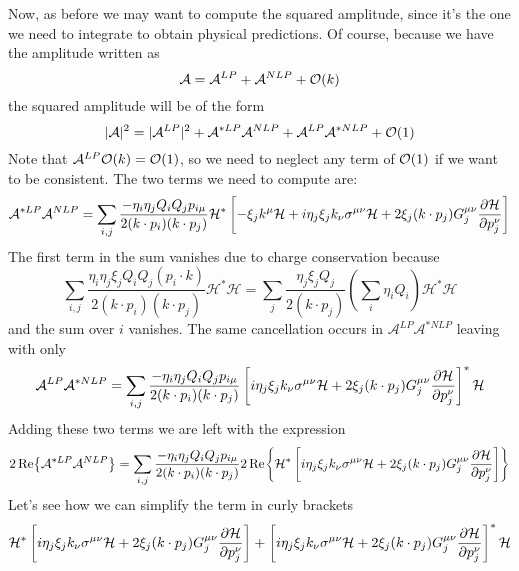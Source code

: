 \documentclass{article}
\begin{document}
Now, as before we may want to compute the squared amplitude,
since it's the one we need to integrate to obtain physical predictions.
Of course, because we have the amplitude written as
$$\mathcal{A}=\mathcal{A}^{LP} + \mathcal{A}^{NLP} + \order{k}$$
the squared amplitude will be of the form
\begin{equation}
	|\mathcal{A}|^2
	= |\mathcal{A}^{LP}|^2 + \mathcal{A}^{*LP}\mathcal{A}^{NLP}
	+ \mathcal{A}^{LP}\mathcal{A}^{*NLP}
	+ \order{1}
\end{equation}
Note that $\mathcal{A}^{LP} \order{k} = \order{1}$,
so we need to neglect any term of $ \order{1}$ if we want to be consistent.
The two terms we need to compute are:
\begin{equation}
	\mathcal{A}^{*LP} \mathcal{A}^{NLP}
	= \sum_{i,j} \frac{-\eta_i \eta_j Q_i Q_j p_{i\mu}}{2(k \cdot p_i)(k \cdot p_j)}
	\mathcal{H}^*
	\left[
		- \xi_j k^\mu \mathcal{H}
		+ i\eta_j \xi_j k_\nu \sigma^{\mu\nu} \mathcal{H}
		+ 2\xi_j (k \cdot p_j) G_j^{\mu \nu} \pdv{\mathcal{H}}{p_{j}^\nu}
	\right]
\end{equation}
The first term in the sum vanishes due to charge conservation because
\begin{equation}
	\sum_{i,j}
	\frac{\eta_i \eta_j\xi_j Q_i Q_j (p_{i} \cdot k)}{2(k \cdot p_i)(k \cdot p_j)}
	\mathcal{H}^* \mathcal{H}
	= \sum_{j} \frac{\eta_j \xi_j Q_j}{2(k \cdot p_j)} \left(\sum_i \eta_i Q_i\right)
	\mathcal{H}^* \mathcal{H}
\end{equation}
and the sum over $i$ vanishes. The same cancellation occurs in
$\mathcal{A}^{LP}\mathcal{A}^{*NLP}$ leaving with only
\begin{equation*}
	\mathcal{A}^{LP} \mathcal{A}^{*NLP}
	= \sum_{i,j} \frac{-\eta_i \eta_j Q_i Q_j p_{i\mu}}{2(k \cdot p_i)(k \cdot p_j)}
	\left[
		i\eta_j \xi_j k_\nu \sigma^{\mu\nu} \mathcal{H}
		+ 2\xi_j (k \cdot p_j) G_j^{\mu \nu} \pdv{\mathcal{H}}{p_{j}^\nu}
	\right]^* \mathcal{H}
\end{equation*}
Adding these two terms we are left with the expression
\begin{equation}\label{2Re}
	2\Re{\mathcal{A}^{*LP} \mathcal{A}^{NLP}}
	= \sum_{i,j} \frac{-\eta_i \eta_j Q_i Q_j p_{i\mu}}{2(k \cdot p_i)(k \cdot p_j)}
	2\Re{
		\mathcal{H}^*
		\left[
			i\eta_j \xi_j k_\nu \sigma^{\mu\nu} \mathcal{H}
			+ 2\xi_j (k \cdot p_j) G_j^{\mu \nu} \pdv{\mathcal{H}}{p_{j}^\nu}
		\right]
	}
\end{equation}
Let's see how we can simplify the term in curly brackets
\begin{equation*}
	\mathcal{H}^*
	\left[
		i\eta_j \xi_j k_\nu \sigma^{\mu\nu}\mathcal{H}
		+ 2\xi_j (k \cdot p_j) G_j^{\mu \nu} \pdv{\mathcal{H}}{p_{j}^\nu}
	\right]
	+ \left[
		i\eta_j \xi_j k_\nu \sigma^{\mu\nu} \mathcal{H}
		+ 2\xi_j (k \cdot p_j) G_j^{\mu \nu} \pdv{\mathcal{H}}{p_{j}^\nu}
	\right]^*
	\mathcal{H}
\end{equation*}
\end{document}
